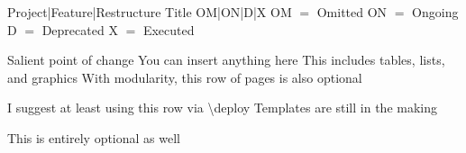 \documentclass{article}
\begin{document}
\frontmatter
{Project|Feature|Restructure} 
{Title}
{OM|ON|D|X}
{\hfill OM $=$ Omitted \hfill ON $=$ Ongoing \hfill D $=$ Deprecated \hfill X $=$ Executed}

\strategy
{Salient point of change}
{You can insert anything here}
{This includes tables, lists, and graphics}
{With modularity, this row of pages is also optional}

\deploy
{I suggest at least using this row via {\textbackslash}deploy}
{Templates are still in the making}

\report
{This is entirely optional as well}
\end{document}
